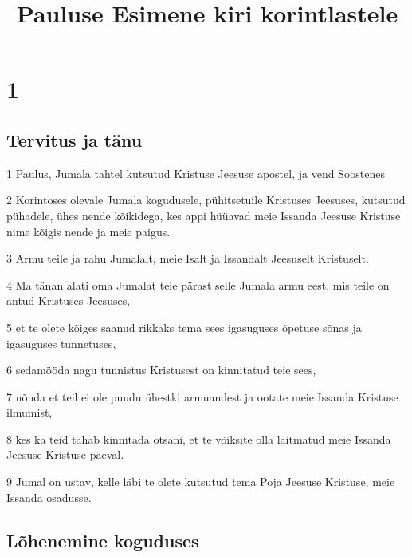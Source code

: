 

\title{Pauluse Esimene kiri korintlastele}

\chapter{1}

\section*{Tervitus ja tänu}

\par 1 Paulus, Jumala tahtel kutsutud Kristuse Jeesuse apostel, ja vend Soostenes
\par 2 Korintoses olevale Jumala kogudusele, pühitsetuile Kristuses Jeesuses, kutsutud pühadele, ühes nende kõikidega, kes appi hüüavad meie Issanda Jeesuse Kristuse nime kõigis nende ja meie paigus.
\par 3 Armu teile ja rahu Jumalalt, meie Isalt ja Issandalt Jeesuselt Kristuselt.
\par 4 Ma tänan alati oma Jumalat teie pärast selle Jumala armu eest, mis teile on antud Kristuses Jeesuses,
\par 5 et te olete kõiges saanud rikkaks tema sees igasuguses õpetuse sõnas ja igasuguses tunnetuses,
\par 6 sedamööda nagu tunnistus Kristusest on kinnitatud teie sees,
\par 7 nõnda et teil ei ole puudu ühestki armuandest ja ootate meie Issanda Kristuse ilmumist,
\par 8 kes ka teid tahab kinnitada otsani, et te võiksite olla laitmatud meie Issanda Jeesuse Kristuse päeval.
\par 9 Jumal on ustav, kelle läbi te olete kutsutud tema Poja Jeesuse Kristuse, meie Issanda osadusse.

\section*{Lõhenemine koguduses}

